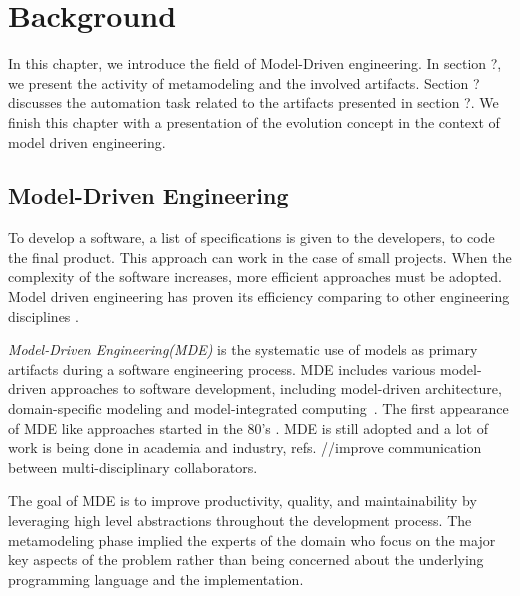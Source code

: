 \clearemptydoublepage
\chapter{Background}

In this chapter, we introduce the field of Model-Driven engineering. In section ?, we present the activity of metamodeling and the involved artifacts. Section ? discusses the automation task related to the artifacts presented in section ?. We finish this chapter with a presentation of the evolution concept in the context of model driven engineering.

\section{Model-Driven Engineering}
To develop a software, a list of specifications is given to the developers, to code the final product. This approach can work in the case of small projects. When the complexity of the software increases, more efficient approaches must be adopted. Model driven engineering has proven  its efficiency comparing to other engineering disciplines \cite{1231146}.

\textit{Model-Driven Engineering(MDE)} is the systematic use of models as primary artifacts during a software engineering process. MDE includes various model-driven approaches to software development, including model-driven architecture, domain-specific modeling and model-integrated computing~\cite{10.1145/1985793.1985882}. The first appearance of MDE like approaches started in the 80's \cite{10.1007/s10270-005-0079-0}. MDE is still adopted  and a lot of work is being done in academia and industry, refs.
//improve communication between multi-disciplinary collaborators.


The goal of MDE is to improve productivity, quality, and maintainability by leveraging high level abstractions throughout the development process. The metamodeling phase implied the experts of the domain who focus on the major key aspects of the problem rather than being concerned about the underlying programming language and the implementation.

